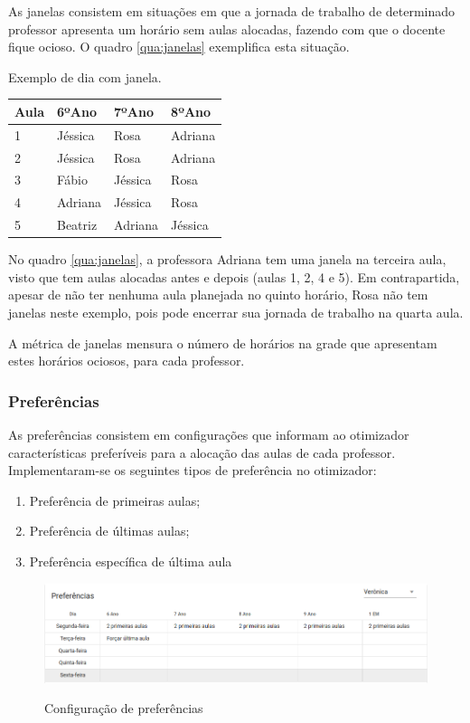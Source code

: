 As janelas consistem em situações em que a jornada de trabalho de determinado professor apresenta um horário sem aulas alocadas, fazendo com que o docente fique ocioso. O quadro \ref{qua:janelas} exemplifica esta situação.

\begin{quadro}[!htb]
	\centering
	\caption{Exemplo de dia com janela.\label{qua:janelas}}
	\begin{tabular}{|p{3cm}|p{3cm}|p{3cm}|p{3cm}|}
		\hline
		\textbf{Aula} & \textbf{6ºAno} & \textbf{7ºAno} & \textbf{8ºAno} \\
		\hline
		1 & Jéssica & Rosa & Adriana \\
		\hline
		2 & Jéssica & Rosa & Adriana \\
		\hline
		3 & Fábio & Jéssica & Rosa \\
		\hline
		4 & Adriana & Jéssica & Rosa \\
		\hline
		5 & Beatriz & Adriana & Jéssica \\
		\hline
	\end{tabular}
\end{quadro}

No quadro \ref{qua:janelas}, a professora Adriana tem uma janela na terceira aula, visto que tem aulas alocadas antes e depois (aulas 1, 2, 4 e 5). Em contrapartida, apesar de não ter nenhuma aula planejada no quinto horário, Rosa não tem janelas neste exemplo, pois pode encerrar sua jornada de trabalho na quarta aula.

A métrica de janelas mensura o número de horários na grade que apresentam estes horários ociosos, para cada professor.

\subsubsection{Preferências}

As preferências consistem em configurações que informam ao otimizador características preferíveis para a alocação das aulas de cada professor. Implementaram-se os seguintes tipos de preferência no otimizador:

\begin{enumerate}
	\item Preferência de primeiras aulas;
	\item Preferência de últimas aulas;
	\item Preferência específica de última aula
\end{enumerate}

\begin{figure}[!htb]
	\centering
	\caption{Configuração de preferências}
	\includegraphics[width=1\textwidth]{./dados/figuras/preferencias}
	\label{fig:preferencias}
\end{figure}

